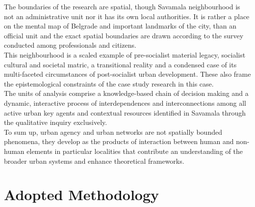 \documentclass[11pt]{report}
\begin{document}
The boundaries of the research are spatial, though Savamala neighbourhood is not an administrative unit nor it has its own local authorities. It is rather a place on the mental map of Belgrade and important landmarks of the city, than an official unit and the exact spatial boundaries are drawn according to the survey conducted among professionals and citizens.
\\
This neighbourhood is a scaled example of pre-socialist material legacy, socialist cultural and societal matric, a transitional reality and a condensed case of its multi-faceted circumstances of post-socialist urban development. These also frame the epistemological constraints of the case study research in this case.
\\
The units of analysis comprise a knowledge-based chain of decision making and a dynamic, interactive process of interdependences and interconnections among all active urban key agents and contextual resources identified in Savamala through the qualitative inquiry exclusively.
\\
To sum up, urban agency and urban networks are not spatially bounded phenomena, they develop as the products of interaction between human and non-human elements in  particular localities that contribute an understanding of the broader urban systems and enhance theoretical frameworks. 

\section{Adopted Methodology}
\end{document}
